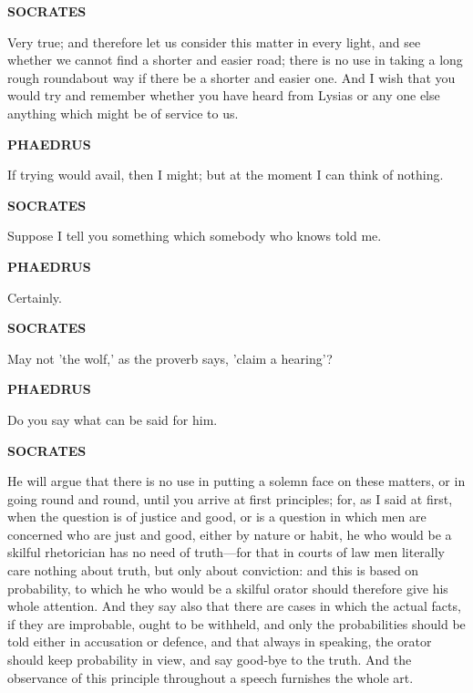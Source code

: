\documentclass[11pt,letter]{article}
\begin{document}
\par \textbf{SOCRATES}
\par   Very true; and therefore let us consider this matter in every light, and see whether we cannot find a shorter and easier road; there is no use in taking a long rough roundabout way if there be a shorter and easier one. And I wish that you would try and remember whether you have heard from Lysias or any one else anything which might be of service to us.

\par \textbf{PHAEDRUS}
\par   If trying would avail, then I might; but at the moment I can think of nothing.

\par \textbf{SOCRATES}
\par   Suppose I tell you something which somebody who knows told me.

\par \textbf{PHAEDRUS}
\par   Certainly.

\par \textbf{SOCRATES}
\par   May not 'the wolf,' as the proverb says, 'claim a hearing'?

\par \textbf{PHAEDRUS}
\par   Do you say what can be said for him.

\par \textbf{SOCRATES}
\par   He will argue that there is no use in putting a solemn face on these matters, or in going round and round, until you arrive at first principles; for, as I said at first, when the question is of justice and good, or is a question in which men are concerned who are just and good, either by nature or habit, he who would be a skilful rhetorician has no need of truth—for that in courts of law men literally care nothing about truth, but only about conviction:  and this is based on probability, to which he who would be a skilful orator should therefore give his whole attention. And they say also that there are cases in which the actual facts, if they are improbable, ought to be withheld, and only the probabilities should be told either in accusation or defence, and that always in speaking, the orator should keep probability in view, and say good-bye to the truth. And the observance of this principle throughout a speech furnishes the whole art.
\end{document}
